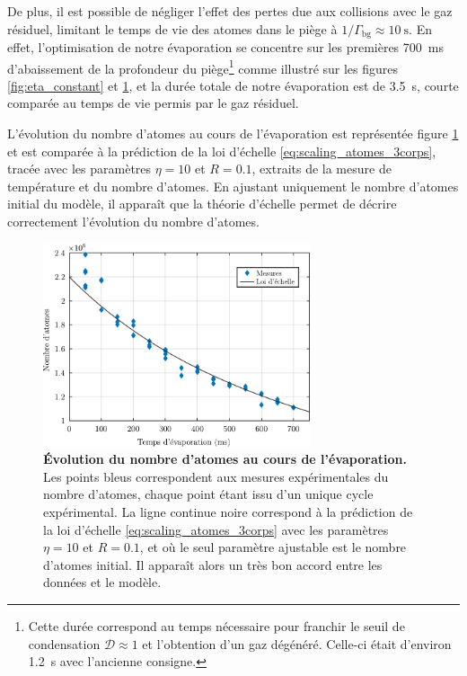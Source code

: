De plus, il est possible de négliger l'effet des pertes due aux collisions avec le gaz résiduel, limitant le temps de vie des atomes dans le piège à $1/\Gamma_{\mathrm{bg}}\approx\SI{10}{\second}$. En effet, l'optimisation de notre évaporation se concentre sur les premières \SI{700}{\milli\second} d'abaissement de la profondeur du piège\footnote{Cette durée correspond au temps nécessaire pour franchir le seuil de condensation $\mathcal{D}\approx 1$ et l'obtention d'un gaz dégénéré. Celle-ci était d'environ \SI{1.2}{\second} avec l'ancienne consigne.} comme illustré sur les figures \ref{fig:eta_constant} et \ref{fig:nombre_atomes_evap}, et la durée totale de notre évaporation est de \SI{3.5}{\second}, courte comparée au temps de vie permis par le gaz résiduel.

L'évolution du nombre d'atomes au cours de l'évaporation est représentée figure \ref{fig:nombre_atomes_evap} et est comparée à la prédiction de la loi d'échelle \ref{eq:scaling_atomes_3corps}, tracée avec les paramètres $\eta=10$ et $R=0.1$, extraits de la mesure de température et du nombre d'atomes. En ajustant uniquement le nombre d'atomes initial du modèle, il apparaît que la théorie d'échelle permet de décrire correctement l'évolution du nombre d'atomes. 


\begin{figure}
\centering
\includegraphics[width=0.7\textwidth]{Fig/modif_exp/Nombre_atomes_evap.pdf}
\caption{\textbf{Évolution du nombre d'atomes au cours de l'évaporation.} Les points bleus correspondent aux mesures expérimentales du nombre d'atomes, chaque point étant issu d'un unique cycle expérimental. La ligne continue noire correspond à la prédiction de la loi d'échelle \ref{eq:scaling_atomes_3corps} avec les paramètres $\eta=10$ et $R=0.1$, et où le seul paramètre ajustable est le nombre d'atomes initial. Il apparaît alors un très bon accord entre les données et le modèle.}
\label{fig:nombre_atomes_evap}
\end{figure}

